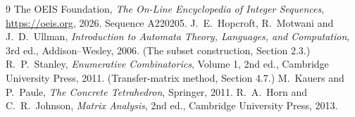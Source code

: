 \documentclass[11pt,a4paper]{article}
\theoremstyle{plain}
\theoremstyle{definition}
\begin{document}
\begin{thebibliography}{9}
 The OEIS Foundation, \emph{The On-Line Encyclopedia of Integer
Sequences}, \url{https://oeis.org}, 2026. Sequence A220205.
 J.~E.~Hopcroft, R.~Motwani and J.~D.~Ullman, \emph{Introduction to Automata
Theory, Languages, and Computation}, 3rd ed., Addison--Wesley, 2006. (The subset
construction, Section 2.3.)
 R.~P.~Stanley, \emph{Enumerative Combinatorics}, Volume 1, 2nd ed.,
Cambridge University Press, 2011. (Transfer-matrix method, Section 4.7.)
 M.~Kauers and P.~Paule, \emph{The Concrete Tetrahedron}, Springer, 2011.
 R.~A.~Horn and C.~R.~Johnson, \emph{Matrix Analysis}, 2nd ed., Cambridge
University Press, 2013.
\end{thebibliography}
\end{document}
